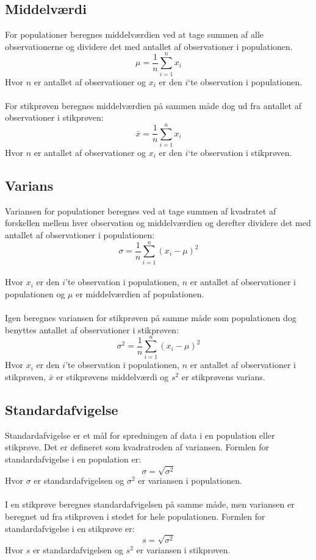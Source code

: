 \subsection{Middelværdi}
For populationer beregnes middelværdien  ved at tage summen af alle observationerne og dividere det med antallet af observationer i populationen.
\[\mu = \frac{1}{n} \sum_{i=1}^{n} x_i\]
Hvor $n$ er antallet af observationer og $x_i$ er den $i$`te observation i populationen.
\\
\\
For stikprøven beregnes middelværdien på sammen måde dog ud fra antallet af observationer i stikprøven:
\[\bar{x} = \frac{1}{n} \sum_{i=1}^{n} x_i\]
Hvor $n$ er antallet af observationer og $x_i$ er den $i$`te observation i stikprøven.

\subsection{Varians}
Variansen for populationer beregnes ved at tage summen af kvadratet af forskellen mellem hver observation og middelværdien og derefter dividere det med antallet af observationer i populationen:
\[\sigma = \frac{1}{n}\sum_{i=1}^{n}(x_i-\mu)^2\]
\\
Hvor $x_i$ er den $i$'te observation i populationen, $n$ er antallet af observationer i populationen og $\mu$ er middelværdien af populationen.
\\
\\
Igen beregnes variansen for stikprøven på samme måde som populationen dog benyttes antallet af observationer i stikprøven:
\[\sigma^2 = \frac{1}{n}\sum_{i=1}^{n}(x_i-\mu)^2\]
Hvor $x_i$ er den $i$'te observation i populationen, $n$ er antallet af observationer i stikprøven, $\bar{x}$ er stikprøvens middelværdi og $s^2$ er stikprøvens varians.

\subsection{Standardafvigelse}
Standardafvigelse er et mål for spredningen af data i en population eller stikprøve. Det er defineret som kvadratroden af variansen. Formlen for standardafvigelse i en population er:
\[\sigma = \sqrt{\sigma^2}\]
Hvor $\sigma$ er standardafvigelsen og $\sigma^2$ er variansen i populationen.
\\
\\
I en stikprøve beregnes standardafvigelsen på samme måde, men variansen er beregnet ud fra stikprøven i stedet for hele populationen. Formlen for standardafvigelse i en stikprøve er:
\[s = \sqrt{\sigma^2}\]
Hvor $s$ er standardafvigelsen og $s^2$ er variansen i stikprøven.



